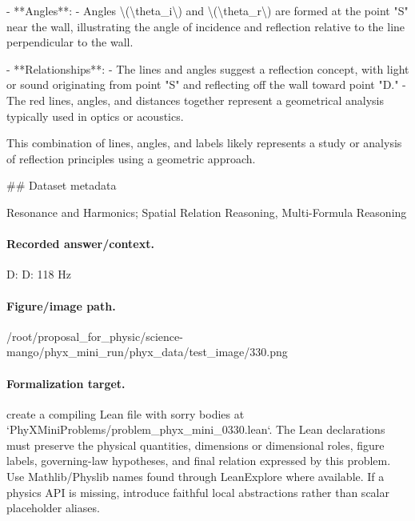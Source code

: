 - **Angles**:
  - Angles \textbackslash{}(\textbackslash{}theta\_i\textbackslash{}) and \textbackslash{}(\textbackslash{}theta\_r\textbackslash{}) are formed at the point "S" near the wall, illustrating the angle of incidence and reflection relative to the line perpendicular to the wall.
  
- **Relationships**:
  - The lines and angles suggest a reflection concept, with light or sound originating from point "S" and reflecting off the wall toward point "D."
  - The red lines, angles, and distances together represent a geometrical analysis typically used in optics or acoustics.

This combination of lines, angles, and labels likely represents a study or analysis of reflection principles using a geometric approach.

\#\# Dataset metadata

Resonance and Harmonics; Spatial Relation Reasoning, Multi-Formula Reasoning

\paragraph{Recorded answer/context.}
D: D: 118 Hz

\paragraph{Figure/image path.}
/root/proposal\_for\_physic/science-mango/phyx\_mini\_run/phyx\_data/test\_image/330.png

\paragraph{Formalization target.}
create a compiling Lean file with sorry bodies at `PhyXMiniProblems/problem\_phyx\_mini\_0330.lean`. The Lean declarations must preserve the physical quantities, dimensions or dimensional roles, figure labels, governing-law hypotheses, and final relation expressed by this problem.
Use Mathlib/Physlib names found through LeanExplore where available. If a physics API is missing, introduce faithful local abstractions rather than scalar placeholder aliases.

